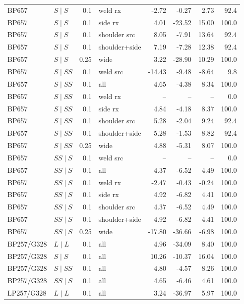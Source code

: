 \documentclass[11pt]{article}
\begin{document}
{\begin{longtable}{@{}llrlrrrr@{}}
BP657 & $S\mid S$ & 0.1 & weld rx & -2.72 & -0.27 & 2.73 & 92.4 \\
BP657 & $S\mid S$ & 0.1 & side rx & 4.01 & -23.52 & 15.00 & 100.0 \\
BP657 & $S\mid S$ & 0.1 & shoulder src & 8.05 & -7.91 & 13.64 & 92.4 \\
BP657 & $S\mid S$ & 0.1 & shoulder+side & 7.19 & -7.28 & 12.38 & 92.4 \\
BP657 & $S\mid S$ & 0.25 & wide & 3.22 & -28.90 & 10.29 & 100.0 \\
BP657 & $S\mid SS$ & 0.1 & weld src & -14.43 & -9.48 & -8.64 & 9.8 \\
BP657 & $S\mid SS$ & 0.1 & all & 4.65 & -4.38 & 8.34 & 100.0 \\
BP657 & $S\mid SS$ & 0.1 & weld rx & -- & -- & -- & 0.0 \\
BP657 & $S\mid SS$ & 0.1 & side rx & 4.84 & -4.18 & 8.37 & 100.0 \\
BP657 & $S\mid SS$ & 0.1 & shoulder src & 5.28 & -2.04 & 9.24 & 92.4 \\
BP657 & $S\mid SS$ & 0.1 & shoulder+side & 5.28 & -1.53 & 8.82 & 92.4 \\
BP657 & $S\mid SS$ & 0.25 & wide & 4.88 & -5.31 & 8.07 & 100.0 \\
BP657 & $SS\mid S$ & 0.1 & weld src & -- & -- & -- & 0.0 \\
BP657 & $SS\mid S$ & 0.1 & all & 4.37 & -6.52 & 4.49 & 100.0 \\
BP657 & $SS\mid S$ & 0.1 & weld rx & -2.47 & -0.43 & -0.24 & 100.0 \\
BP657 & $SS\mid S$ & 0.1 & side rx & 4.92 & -6.82 & 4.41 & 100.0 \\
BP657 & $SS\mid S$ & 0.1 & shoulder src & 4.37 & -6.52 & 4.49 & 100.0 \\
BP657 & $SS\mid S$ & 0.1 & shoulder+side & 4.92 & -6.82 & 4.41 & 100.0 \\
BP657 & $SS\mid S$ & 0.25 & wide & -17.80 & -36.66 & -6.98 & 100.0 \\
BP257/G328 & $L\mid L$ & 0.1 & all & 4.96 & -34.09 & 8.40 & 100.0 \\
BP257/G328 & $S\mid S$ & 0.1 & all & 10.26 & -10.37 & 16.04 & 100.0 \\
BP257/G328 & $S\mid SS$ & 0.1 & all & 4.80 & -4.57 & 8.26 & 100.0 \\
BP257/G328 & $SS\mid S$ & 0.1 & all & 4.65 & -6.46 & 4.61 & 100.0 \\
LP257/G328 & $L\mid L$ & 0.1 & all & 3.24 & -36.97 & 5.97 & 100.0 \\

\end{longtable}}
\end{document}
